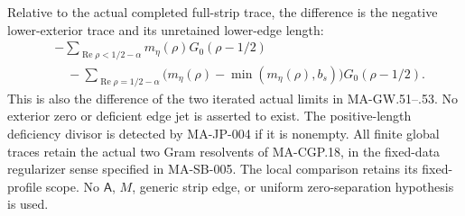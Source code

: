 Relative to the actual completed full-strip trace,
the difference is the negative lower-exterior
trace and its unretained lower-edge length:
\[
 \begin{split}
 &-\sum_{\operatorname{Re}\rho<1/2-\alpha}
                        m_\eta(\rho)G_0(\rho-1/2)\\
 &\quad-\sum_{\operatorname{Re}\rho=1/2-\alpha}
       \bigl(m_\eta(\rho)-\min(m_\eta(\rho),b_s)\bigr)
                                       G_0(\rho-1/2).
 \end{split}
 \tag{MA-SB.69}
\]
This is also the difference of the two iterated
actual limits in MA-GW.51--.53.
No exterior zero or deficient edge jet is asserted
to exist.  The positive-length deficiency divisor
is detected by MA-JP-004 if it is nonempty.
All finite global traces retain the actual two
Gram resolvents of MA-CGP.18, in the fixed-data
regularizer sense specified in MA-SB-005.
The local comparison retains its fixed-profile
scope.  No $\mathsf A$, $M$, generic strip edge,
or uniform zero-separation hypothesis is used.
